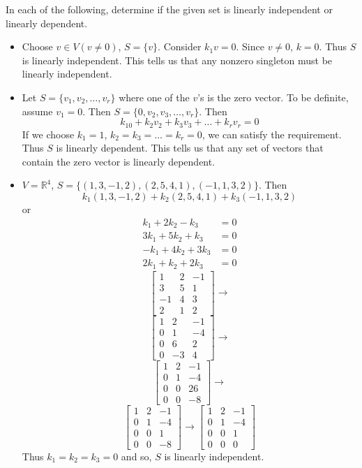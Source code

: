 \documentclass[12pt]{article}
\begin{document}
\begin{example} In each of the following, determine if the given set is linearly independent or linearly dependent. \begin{itemize} 
\item Choose $v \in V (v \neq 0)$, $S = \{v\}$. Consider $k_1v = 0$. Since $v \neq 0$, $k = 0$. Thus $S$ is linearly independent. This tells us that any nonzero singleton must be linearly independent. 
\item Let $S = \{v_1, v_2, \dots, v_r\}$ where one of the $v$'s is the zero vector. To be definite, assume $v_1 = 0$. Then $S = \{0, v_2, v_3, \dots, v_r\}$. Then $$ k_10 + k_2v_2 + k_3v_3 + \dots + k_rv_r = 0$$ If we choose $k_1 = 1$, $k_2 = k_3 = \dots = k_r = 0$, we can satisfy the requirement. Thus $S$ is linearly dependent. This tells us that any set of  vectors that contain the zero vector is linearly dependent. 
\item $V = \mathbb{R}^4$, $S = \{(1, 3, -1, 2), (2, 5, 4, 1), (-1, 1, 3, 2)\}$. Then $$k_1(1, 3, -1, 2) + k_2(2, 5, 4, 1) + k_3(-1, 1, 3, 2)$$ or $$\begin{aligned} k_1 + 2k_2 - k_3 &= 0 \\ 3k_1 + 5k_2 + k_3 &= 0 \\ -k_1 + 4k_2 + 3k_3 &= 0 \\ 2k_1 + k_2 + 2k_3 &= 0 \end{aligned} $$ $$ \begin{bmatrix} 1 & 2 & -1 \\ 3 & 5 & 1 \\ -1 & 4 & 3 \\ 2 & 1 & 2 \end{bmatrix} \rightarrow $$ $$ \begin{bmatrix} 1 & 2 & -1 \\ 0 & 1 & -4 \\ 0 & 6 & 2 \\ 0 & -3 & 4 \end{bmatrix} \rightarrow $$ $$ \begin{bmatrix} 1 & 2 & -1 \\ 0 & 1 & -4 \\ 0 & 0 & 26 \\ 0 & 0 & -8 \end{bmatrix} \rightarrow $$ $$ \begin{bmatrix} 1 & 2 & -1 \\ 0 & 1 & -4 \\ 0 & 0 & 1 \\ 0 & 0 & -8 \end{bmatrix} \rightarrow \begin{bmatrix} 1 & 2 & -1 \\ 0 & 1 & -4 \\ 0 & 0 & 1 \\ 0 & 0 & 0 \end{bmatrix} $$ Thus $k_1 = k_2 = k_3 = 0$ and so, $S$ is linearly independent.

\end{itemize}
\end{example}
\end{document}
